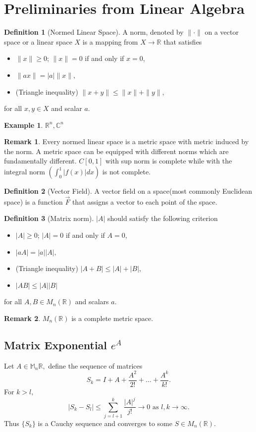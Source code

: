 \documentclass[12pt,reqno]{amsart}
\theoremstyle{plain}
\theoremstyle{definition}
\newtheorem{defn}{Definition}
\newtheorem{eg}{Example}
\newtheorem{rem}{Remark}
\begin{document}
\section{Preliminaries from Linear Algebra}
\begin{defn}[Normed Linear Space]
    A norm, denoted by $\|\cdot\|$ on a vector space or a linear space $X$ is a mapping from $X \to \mathbb{R}$ that satisfies
    \begin{itemize}
        \item $\|x\| \geq 0$; $\|x\| = 0$ if and only if $x = 0$,
        \item $\|ax\| = |a|\|x\|,$
        \item (Triangle inequality) $\|x+y\| \leq \|x\| + \|y\|$,
    \end{itemize} 
    for all $x,y \in X$ and scalar $a$.
\end{defn}
\begin{eg}
    $\mathbb{R}^n, \mathbb{C}^n$
\end{eg}
\begin{rem}
    Every normed linear space is a metric space with metric induced by the norm. A metric space can be equipped with different norms which are fundamentally different. $C[0,1]$ with sup norm is complete while with the integral norm $\left(\int_0^1 \left|f(x)\right| dx\right)$ is not complete.
\end{rem}
\begin{defn}[Vector Field]
    A vector field on a space(most commonly Euclidean space) is a function $\vec{F}$ that assigns a vector to each point of the space.
\end{defn}
\begin{defn}[Matrix norm]
    $|A|$ should satisfy the following criterion
    \begin{itemize}
        \item $|A| \geq 0$; $|A| = 0$ if and only if $A = 0$,
        \item $|aA| = |a||A|,$
        \item (Triangle inequality) $|A + B| \leq |A| + |B|,$
        \item $|AB| \leq |A||B|$
    \end{itemize}
    for all $A,B \in M_n(\mathbb{R})$ and scalars $a$.
\end{defn}
\begin{rem}
    $M_n(\mathbb{R})$ is a complete metric space.
\end{rem}
\subsection{Matrix Exponential $e^A$}
Let $A \in \mathbb{M}_n{\mathbb{R}},$ define the sequence of matrices
$$ S_k = I + A + \frac{A^2}{2!} + \dots + \frac{A^k}{k!}.$$
For $k > l,$
$$ |S_k - S_l| \leq \sum\limits_{j = l + 1}^{k} \frac{|A|^j}{j!} \to 0 \text{ as } l,k \to \infty.$$
Thus $\{S_k\}$ is a Cauchy sequence and converges to some $S \in M_n(\mathbb{R}).$
\end{document}
